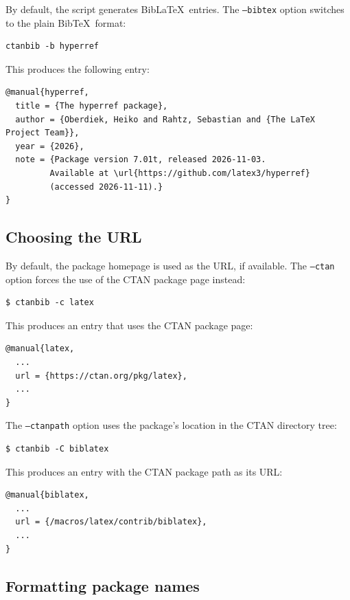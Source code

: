 \documentclass[11pt]{ltxdoc}
\begin{document}
By default, the script generates Bib\LaTeX\ entries. The \texttt{--bibtex}
option switches to the plain Bib\TeX\ format:

\begin{verbatim}
ctanbib -b hyperref
\end{verbatim}

\noindent This produces the following entry:

\begin{verbatim}
@manual{hyperref,
  title = {The hyperref package},
  author = {Oberdiek, Heiko and Rahtz, Sebastian and {The LaTeX Project Team}},
  year = {2026},
  note = {Package version 7.01t, released 2026-11-03. 
         Available at \url{https://github.com/latex3/hyperref} 
         (accessed 2026-11-11).}
}
\end{verbatim}

\subsection{Choosing the URL}

By default, the package homepage is used as the URL, if available.
The \texttt{--ctan} option forces the use of the CTAN package page instead:

\begin{verbatim}
$ ctanbib -c latex
\end{verbatim}

\noindent This produces an entry that uses the CTAN package page:

\begin{verbatim}
@manual{latex,
  ...
  url = {https://ctan.org/pkg/latex},
  ...
}
\end{verbatim}

The \texttt{--ctanpath} option uses the package's location in the CTAN
directory tree:

\begin{verbatim}
$ ctanbib -C biblatex
\end{verbatim}

\noindent This produces an entry with the CTAN package path as its URL:

\begin{verbatim}
@manual{biblatex,
  ...
  url = {/macros/latex/contrib/biblatex},
  ...
}
\end{verbatim}

\subsection{Formatting package names}
\end{document}
